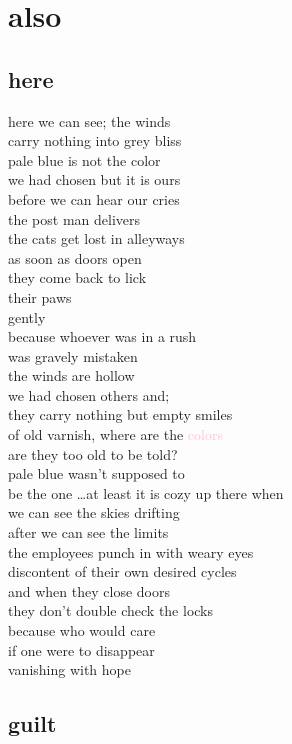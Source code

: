 \documentclass{article}
\begin{document}
\section{also}
\subsection{here}

here we can see; the winds\\
carry nothing into grey bliss\\
pale blue is not the color\\
we had chosen but it is ours\\
before we can hear our cries\\
the post man delivers\\
the cats get lost in alleyways\\
as soon as doors open\\
they come back to lick\\
their paws\\
gently\\
because whoever was in a rush\\
was gravely mistaken\\

the winds are hollow\\
we had chosen others and;\\
they carry nothing but empty smiles\\
of old varnish, where are the \textcolor{pink}{colors}\\
are they too old to be told?\\
pale blue wasn't supposed to\\
be the one \ldots at least it is cozy up there when\\
we can see the skies drifting\\

after we can see the limits\\
the employees punch in with weary eyes\\
discontent of their own desired cycles\\
and when they close doors\\
they don't double check the locks\\
because who would care\\
if one were to disappear\\
vanishing with hope\\
\clearpage

\subsection{guilt}
\end{document}
